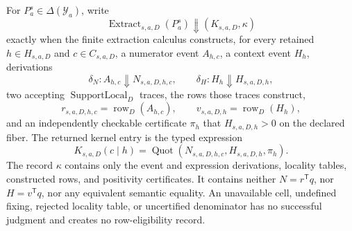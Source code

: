 For \(P_a^s\in\Delta(\mathcal Y_a)\), write
\[
\operatorname{Extract}_{s,a,D}(P_a^s)
\Downarrow(K_{s,a,D},\kappa)
\]
exactly when the finite extraction calculus constructs, for every retained \(h\in H_{s,a,D}\) and \(c\in C_{s,a,D}\), a numerator event \(A_{h,c}\), a context event \(H_h\), derivations
\[
\delta_N:A_{h,c}\Downarrow N_{s,a,D,h,c},
\qquad
\delta_H:H_h\Downarrow H_{s,a,D,h},
\]
two accepting \(\operatorname{SupportLocal}_D\) traces, the rows those traces construct,
\[
r_{s,a,D,h,c}=\operatorname{row}_D(A_{h,c}),
\qquad
v_{s,a,D,h}=\operatorname{row}_D(H_h),
\]
and an independently checkable certificate \(\pi_h\) that \(H_{s,a,D,h}>0\) on the declared fiber.  The returned kernel entry is the typed expression
\[
K_{s,a,D}(c\mid h)=
\operatorname{Quot}(N_{s,a,D,h,c},H_{s,a,D,h},\pi_h).
\]
The record \(\kappa\) contains only the event and expression derivations, locality tables, constructed rows, and positivity certificates.  It contains neither \(N=r^{\mathsf T}q\), nor \(H=v^{\mathsf T}q\), nor any equivalent semantic equality.  An unavailable cell, undefined fixing, rejected locality table, or uncertified denominator has no successful judgment and creates no row-eligibility record.